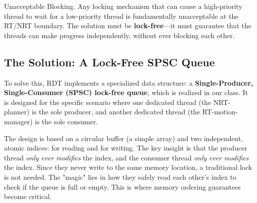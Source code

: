 \begin{dangerbox}{Unacceptable Blocking.}
    Any locking mechanism that can cause a high-priority thread to wait for a low-priority thread is fundamentally unacceptable at the RT/NRT boundary. The solution must be \textbf{lock-free}—it must guarantee that the threads can make progress independently, without ever blocking each other.
\end{dangerbox}

\subsection{The Solution: A Lock-Free SPSC Queue}
\label{subsec:lock_free_spsc_conceptual}

To solve this, RDT implements a specialized data structure: a \textbf{Single-Producer, Single-Consumer (SPSC) lock-free queue}, which is realized in our  class. It is designed for the specific scenario where one dedicated thread (the NRT-planner) is the sole producer, and another dedicated thread (the RT-motion-manager) is the sole consumer.

The design is based on a circular buffer (a simple array) and two independent, atomic indices:  for reading and  for writing. The key insight is that the producer thread \textit{only ever modifies} the  index, and the consumer thread \textit{only ever modifies} the  index. Since they never write to the same memory location, a traditional lock is not needed. The "magic" lies in how they safely read each other's index to check if the queue is full or empty. This is where memory ordering guarantees become critical.

